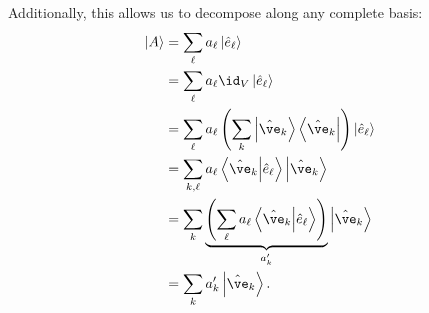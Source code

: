 \documentclass[10pt]{mypackage}
\begin{document}
Additionally, this allows us to decompose along any complete basis:
\begin{align*}
  \ket{A} &= \sum_{\ell}a_{\ell}\ket{\hat{e}_{\ell}}\\
          &= \sum_{\ell}a_{\ell}\id_{V}\ket{\hat{e}_{\ell}}\\
          &= \sum_{\ell}a_{\ell}\left(\sum_{k}\ket{\hat{\ve}_k}\bra{\hat{\ve}_k}\right)\ket{\hat{e}_{\ell}}\\
          &= \sum_{k,\ell}a_{\ell}\braket{\hat{\ve}_{k}}{\hat{e}_{\ell}}\ket{\hat{\ve}_k}\\
          &= \sum_{k}\underbrace{\left(\sum_{\ell}a_{\ell}\braket{\hat{\ve}_k}{\hat{e}_{\ell}}\right)}_{a_{k}'}\ket{\hat{\ve}_k}\\
          &= \sum_{k}a_k'\ket{\hat{\ve}_k}.
\end{align*}
\end{document}

